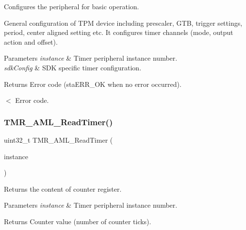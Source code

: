 Configures the peripheral for basic operation. 

General configuration of T\+PM device including prescaler, G\+TB, trigger settings, period, center aligned setting etc. It configures timer channels (mode, output action and offset).


\begin{DoxyParams}{Parameters}
{\em instance} & Timer peripheral instance number. \\
\hline
{\em sdk\+Config} & S\+DK specific timer configuration.\\
\hline
\end{DoxyParams}
\begin{DoxyReturn}{Returns}
Error code (sta\+E\+R\+R\+\_\+\+OK when no error occurred). 
\end{DoxyReturn}
$<$ Error code. \mbox{\label{group__function__group_gaa5bf50001a224cd4dc43250cdfd6d915}} 
\subsubsection{\texorpdfstring{TMR\_AML\_ReadTimer()}{TMR\_AML\_ReadTimer()}}
{\footnotesize\ttfamily uint32\+\_\+t T\+M\+R\+\_\+\+A\+M\+L\+\_\+\+Read\+Timer (\begin{DoxyParamCaption}\item[{\mbox{\hyperlink{common__aml_8h_a562bd37c7d07adcedec5993bc0cd96e5}{aml\+\_\+instance\+\_\+t}}}]{instance }\end{DoxyParamCaption})}



Returns the content of counter register. 


\begin{DoxyParams}{Parameters}
{\em instance} & Timer peripheral instance number.\\
\hline
\end{DoxyParams}
\begin{DoxyReturn}{Returns}
Counter value (number of counter ticks). 
\end{DoxyReturn}
\mbox{\label{group__function__group_gaf082ed62ce28809934e491636f66d9d3}} 
